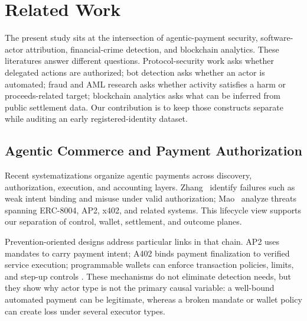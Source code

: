 

\section{Related Work}\label{sec:related}

The present study sits at the intersection of agentic-payment security,
software-actor attribution, financial-crime detection, and blockchain
analytics.  These literatures answer different questions.  Protocol-security
work asks whether delegated actions are authorized; bot detection asks whether
an actor is automated; fraud and AML research asks whether activity satisfies a
harm or proceeds-related target; blockchain analytics asks what can be inferred
from public settlement data.  Our contribution is to keep those constructs
separate while auditing an early registered-identity dataset.

\subsection{Agentic Commerce and Payment Authorization}\label{subsec:rw-agentcommerce}

Recent systematizations organize agentic payments across discovery,
authorization, execution, and accounting layers.  Zhang~\etal
\cite{zhang2026sok} identify failures such as weak intent binding and misuse
under valid authorization; Mao~\etal\cite{mao2026sok} analyze threats spanning
ERC-8004, AP2, x402, and related systems.  This lifecycle view supports our
separation of control, wallet, settlement, and outcome planes.

Prevention-oriented designs address particular links in that chain.  AP2 uses
mandates to carry payment intent\cite{ap2protocol2025}; A402 binds payment
finalization to verified service execution\cite{li2026a402}; programmable
wallets can enforce transaction policies, limits, and step-up controls
\cite{erc4337,metamask2026agentwallet}.  These mechanisms do not eliminate
detection needs, but they show why actor type is not the primary causal
variable: a well-bound automated payment can be legitimate, whereas a broken
mandate or wallet policy can create loss under several executor types.

